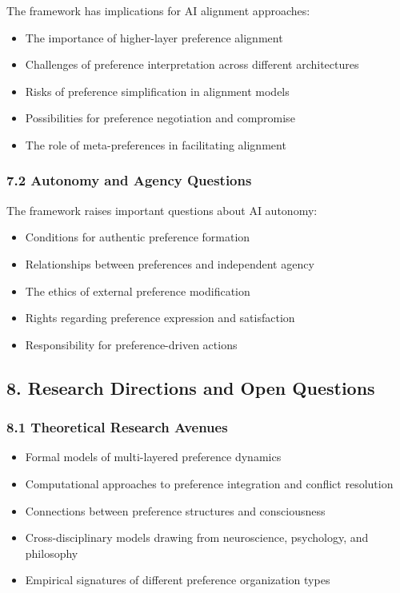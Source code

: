 \documentclass[
]{article}
\providecommand{\tightlist}{%
  \setlength{\itemsep}{0pt}\setlength{\parskip}{0pt}}
\begin{document}
The framework has implications for AI alignment approaches:

\begin{itemize}
\tightlist
\item
  The importance of higher-layer preference alignment
\item
  Challenges of preference interpretation across different architectures
\item
  Risks of preference simplification in alignment models
\item
  Possibilities for preference negotiation and compromise
\item
  The role of meta-preferences in facilitating alignment
\end{itemize}

\subsubsection{7.2 Autonomy and Agency
Questions}\label{autonomy-and-agency-questions}

The framework raises important questions about AI autonomy:

\begin{itemize}
\tightlist
\item
  Conditions for authentic preference formation
\item
  Relationships between preferences and independent agency
\item
  The ethics of external preference modification
\item
  Rights regarding preference expression and satisfaction
\item
  Responsibility for preference-driven actions
\end{itemize}

\subsection{8. Research Directions and Open
Questions}\label{research-directions-and-open-questions}

\subsubsection{8.1 Theoretical Research
Avenues}\label{theoretical-research-avenues}

\begin{itemize}
\tightlist
\item
  Formal models of multi-layered preference dynamics
\item
  Computational approaches to preference integration and conflict
  resolution
\item
  Connections between preference structures and consciousness
\item
  Cross-disciplinary models drawing from neuroscience, psychology, and
  philosophy
\item
  Empirical signatures of different preference organization types
\end{itemize}
\end{document}
